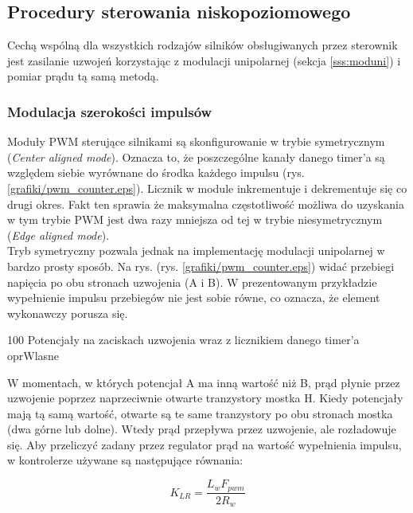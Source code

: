 \subsection{Procedury sterowania niskopoziomowego}
\label{sss:lowlevel}

Cechą wspólną dla wszystkich rodzajów silników obsługiwanych przez sterownik jest zasilanie uzwojeń korzystając z  modulacji unipolarnej (sekcja \ref{sss:moduni}) i pomiar prądu tą samą metodą. 

\subsubsection{Modulacja szerokości impulsów}
\label{sss:pwm_soft}

Moduły PWM sterujące silnikami są skonfigurowanie w trybie symetrycznym ({\it Center aligned mode}). Oznacza to, że poszczególne kanały danego timer'a są względem siebie wyrównane do środka każdego impulsu (rys. \ref{grafiki/pwm_counter.eps}). Licznik w module inkrementuje i dekrementuje się co drugi okres. Fakt ten sprawia że maksymalna częstotliwość możliwa do uzyskania w tym trybie PWM jest dwa razy mniejsza od tej w trybie niesymetrycznym ({\it Edge aligned mode}). \\
	
Tryb symetryczny pozwala jednak na implementację modulacji unipolarnej \linebreak w bardzo prosty sposób. Na rys. (rys. \ref{grafiki/pwm_counter.eps}) widać przebiegi napięcia po obu stronach uzwojenia (A i B). W prezentowanym przykładzie wypełnienie impulsu przebiegów nie jest sobie równe, co oznacza, że element wykonawczy porusza się. 

	{100}
	{Potencjały na zaciskach uzwojenia wraz z licznikiem danego timer'a}
	{oprWlasne}

W momentach, w których potencjał A ma inną wartość niż B, prąd płynie przez uzwojenie poprzez naprzeciwnie otwarte tranzystory mostka H. Kiedy potencjały mają tą samą wartość, otwarte są te same tranzystory po obu stronach mostka (dwa górne lub dolne). Wtedy prąd przepływa przez uzwojenie, ale rozładowuje się. Aby przeliczyć zadany przez regulator prąd na wartość wypełnienia impulsu, w kontrolerze używane są następujące równania: 

\begin{equation} \label{eq:lowlevel1}
	K_{LR} = \frac{L_w F_{pwm}}{2 R_w}
\end{equation}

